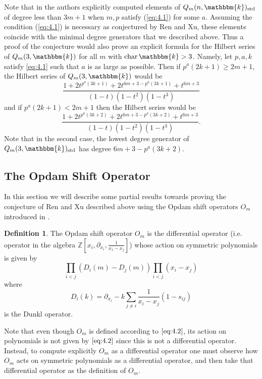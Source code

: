 \documentclass[11pt]{article}
\theoremstyle{definition}
\newtheorem{definition}[theorem]{Definition}
\renewcommand{\k}{\mathbbm{k}}
\newcommand{\std}{\mathrm{std}}
\renewcommand{\char}{\text{char\,}}
\newcommand{\Z}{\mathbb{Z}}
\begin{document}
Note that in \cite{Ren_2020} the authors explicitly computed elements of $Q_m(n,\k)_\std$ of degree less than $3m+1$ when $m,p$ satisfy (\ref{eq:4.1}) for some $a$. Assuming the condition (\ref{eq:4.1}) is necessary as conjectured by Ren and Xu, these elements coincide with the minimal degree generators that we described above. Thus a proof of the conjecture would also prove an explicit formula for the Hilbert series of $Q_m(3,\k)$ for all $m$ with $\char\k>3$. Namely, let $p,a,k$ satisfy \ref{eq:4.1} such that $a$ is as large as possible. Then if $p^a(2k+1)\geq 2m+1$, the Hilbert series of $Q_m(3,\k)$ would be
$$\frac{1+2t^{p^a(3k+1)}+2t^{6m+3-p^a(3k+1)}+t^{6m+3}}{(1-t)(1-t^2)(1-t^3)}$$
and if $p^a(2k+1)<2m+1$ then the Hilbert series would be
$$\frac{1+2t^{p^a(3k+2)}+2t^{6m+3-p^a(3k+2)}+t^{6m+3}}{(1-t)(1-t^2)(1-t^3)}.$$
Note that in the second case, the lowest degree generator of $Q_m(3,\k)_\std$ has degree \linebreak
${6m+3-p^a(3k+2)}$.

\subsection{The Opdam Shift Operator}

In this section we will describe some partial results towards proving the conjecture of Ren and Xu described above using the Opdam shift operators $O_m$ introduced in \cite{Opdam1989}.

\begin{definition}
    The Opdam shift operator $O_m$ is the differential operator (i.e. operator in the algebra $\Z\left[x_i,\partial_{x_i},\frac{1}{x_1-x_j}\right]$) whose action on symmetric polynomials is given by 
    \begin{equation}\label{eq:4.2}
        \prod_{i<j}\left(D_i(m)-D_j(m)\right)\prod_{i<j}(x_i-x_j)\tag{4.2}
    \end{equation}
    where
    $$D_i(k)=\partial_{x_i}-k\sum_{j\neq i}\frac{1}{x_i-x_j}(1-s_{ij})$$
    is the Dunkl operator.
\end{definition}

Note that even though $O_m$ is defined according to $\ref{eq:4.2}$, its action on polynomials is not given by $\ref{eq:4.2}$ since this is not a differential operator. Instead, to compute explicitly $O_m$ as a differential operator one must observe how $O_m$ acts on symmetric polynomials as a differential operator, and then take that differential operator as the definition of $O_m$.
\end{document}
